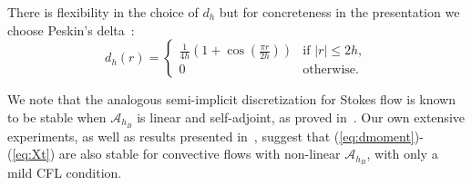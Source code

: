 \documentclass[preprint,12pt]{elsarticle}
\newcommand{\C}[1]{\mathcal{#1}}
\begin{document}
There is flexibility in the choice of $d_h$ but for concreteness in the presentation we choose Peskin's 
delta~\cite{Peskin77}:
\begin{equation}
d_h(r) = \begin{cases}
\frac{1}{4h}\left( 1+\cos(\frac{\pi r}{2h})\right)& \textrm{if } |r|\leq 2h, \\
0& \textrm{otherwise}.
\end{cases}
\end{equation}

We note that the analogous semi-implicit discretization for Stokes flow is known to be stable when $\C{A}_{h_B}$ is linear and self-adjoint, as proved in~\cite{NFGK2007}. Our own extensive experiments, as well as results presented in~\cite{NFGK2007}, suggest that (\ref{eq:dmoment})-(\ref{eq:Xt}) are also stable for convective flows with non-linear $\C{A}_{h_B}$,  with only a mild CFL condition.
\end{document}
